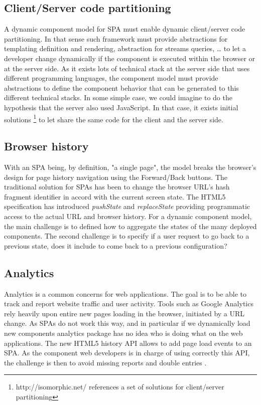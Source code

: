 \subsection{Client/Server code partitioning}
A dynamic component model for SPA must enable dynamic client/server code partitioning. In that sense such framework must provide abstractions for templating definition and rendering, abstraction for streams queries, … to let a developer change dynamically if the component is executed within the browser or at the server side. As it exists lots of technical stack at the server side that uses different programming languages, the component model must provide abstractions to define the component behavior that can be generated to this different technical stacks. In some simple case, we could imagine to do the hypothesis that the server also used JavaScript. In that case, it exists initial solutions \footnote{http://isomorphic.net/ references a set of solutions for client/server partitioning} to let share the same code for the client and the server side.  

\subsection{Browser history}
With an SPA being, by definition, "a single page", the model breaks the browser's design for page history navigation using the Forward/Back buttons. The traditional solution for SPAs has been to change the browser URL's hash fragment identifier in accord with the current screen state. 
The HTML5 specification has introduced \textit{pushState} and \textit{replaceState} providing programmatic access to the actual URL and browser history. 
For a dynamic component model, the main challenge is to defined how to aggregate the states of the many deployed components. 
The second challenge is to specify if a user request to go back to a previous state, does it include to come back to a previous configuration? 


\subsection{Analytics}

Analytics is a common concerns for web applications. The goal is to be able to track and report website traffic and user activity. 
Tools such as Google Analytics rely heavily upon entire new pages loading in the browser, initiated by a URL change. As SPAs do not work this way, and in particular if we dynamically load new components analytics package has no idea who is doing what on the web applications. 
The new HTML5 history API allows to add page load events to an SPA. 
As the component web developers is in charge of using correctly this API, the challenge is then to avoid missing reports and double entries   .

